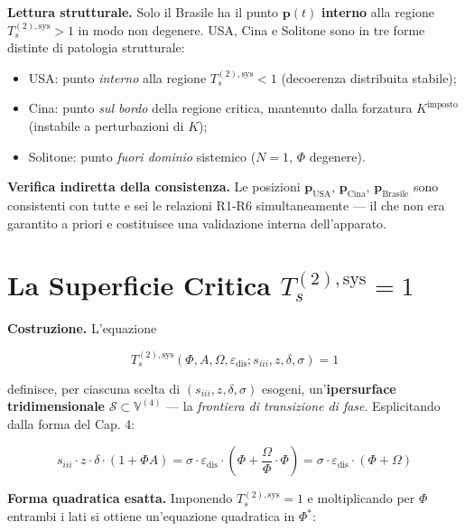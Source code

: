 \Hypoth{} \textbf{Lettura strutturale.} Solo il Brasile ha il punto
\(\boldsymbol{p}(t)\) \textbf{interno} alla regione
\(T_s^{(2),\text{sys}} > 1\) in modo non degenere. USA, Cina e Solitone
sono in tre forme distinte di patologia strutturale:

\begin{itemize}
\tightlist
\item
  USA: punto \emph{interno} alla regione \(T_s^{(2),\text{sys}} < 1\)
  (decoerenza distribuita stabile);
\item
  Cina: punto \emph{sul bordo} della regione critica, mantenuto dalla
  forzatura \(K^{\text{imposto}}\) (instabile a perturbazioni di \(K\));
\item
  Solitone: punto \emph{fuori dominio} sistemico (\(N=1\), \(\Phi\)
  degenere).
\end{itemize}

\Proved{} \textbf{Verifica indiretta della consistenza.} Le posizioni
\(\boldsymbol{p}_{\text{USA}}\), \(\boldsymbol{p}_{\text{Cina}}\),
\(\boldsymbol{p}_{\text{Brasile}}\) sono consistenti con tutte e sei le
relazioni R1-R6 simultaneamente --- il che non era garantito a priori e
costituisce una validazione interna dell'apparato.



\section{\texorpdfstring{La Superficie Critica
\(T_s^{(2),\text{sys}} = 1\)}{La Superficie Critica T\_s\^{}\{(2),\textbackslash text\{sys\}\} = 1}}\label{la-superficie-critica-t_s2textsys-1}

\Hypoth{} \textbf{Costruzione.} L'equazione

\[
T_s^{(2),\text{sys}}(\Phi, A, \Omega, \varepsilon_{\text{dis}}; s_{iii}, z, \delta, \sigma) = 1
\]

definisce, per ciascuna scelta di \((s_{iii}, z, \delta, \sigma)\)
esogeni, un'\textbf{ipersurface tridimensionale}
\(\mathcal{S} \subset \mathbb{V}^{(4)}\) --- la \emph{frontiera di
transizione di fase}. Esplicitando dalla forma del Cap. 4:

\[
s_{iii} \cdot z \cdot \delta \cdot (1 + \Phi A) = \sigma \cdot \varepsilon_{\text{dis}} \cdot \left(\Phi + \frac{\Omega}{\Phi} \cdot \Phi\right) = \sigma \cdot \varepsilon_{\text{dis}} \cdot (\Phi + \Omega)
\]

\Hypoth{} \textbf{Forma quadratica esatta.} Imponendo
\(T_s^{(2),\text{sys}} = 1\) e moltiplicando per \(\Phi\) entrambi i
lati si ottiene un'equazione quadratica in \(\Phi^*\):

